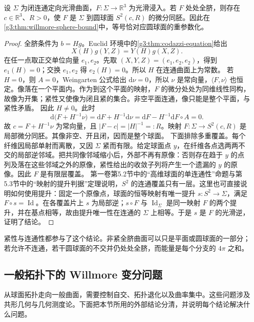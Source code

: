 \begin{proposition}\label{g3:prop:closed-umbilical-sphere}
	设 \(\Sigma\) 为闭连通定向光滑曲面，\(F:\Sigma\to\mathbb R^3\) 为光滑浸入。若 \(F\) 处处全脐，则存在 \(c\in\mathbb R^3\)、\(R>0\)，使 \(F\) 是 \(\Sigma\) 到圆球面 \(S^2(c,R)\) 的微分同胚。因此在\cref{g3:thm:willmore-sphere-bound}中，等号恰对应圆球面的重参数化。
\end{proposition}
\begin{proof}
	全脐条件为 \(b=Hg\)。Euclid 环境中的\cref{g3:thm:codazzi-equation}给出
	\[
		X(H)g(Y,Z)=Y(H)g(X,Z).
	\]
	在任一点取正交单位向量 \(e_1,e_2\)。先取 \((X,Y,Z)=(e_1,e_2,e_2)\)，得到 \(e_1(H)=0\)；交换 \(e_1,e_2\) 得 \(e_2(H)=0\)。所以 \(H\) 在连通曲面上为常数。
	若 \(H=0\)，则 \(A=0\)，Weingarten 公式给出 \(\mathrm d\nu=0\)，所以 \(\nu\) 是常向量，\(\langle F,\nu\rangle\) 也恒定。像落在一个平面内。作为到这个平面的映射，\(F\) 的微分处处为同维线性同构，故像为开集；紧性又使像为闭且紧的集合。非空平面连通，像只能是整个平面，与紧性矛盾。
	因此 \(H\ne0\)。此时
	\[
		\mathrm d\bigl(F+H^{-1}\nu\bigr)
		=\mathrm dF+H^{-1}\mathrm d\nu
		=\mathrm dF-H^{-1}\mathrm dF\circ A=0.
	\]
	故 \(c=F+H^{-1}\nu\) 为常向量，且 \(|F-c|=|H|^{-1}=:R\)。映射 \(F:\Sigma\to S^2(c,R)\) 是局部微分同胚。其像非空、开且闭，因而是整个球面。
	下面排除多重覆盖。每个纤维因局部单射而离散，又因 \(\Sigma\) 紧而有限。给定球面点 \(y\)，在纤维各点选两两不交的局部逆邻域。把共同像邻域缩小后，外部不再有原像：否则存在趋于 \(y\) 的点列及落在这些邻域之外的原像，紧性给出的收敛子列将产生一个遗漏的 \(y\) 的原像。因此 \(F\) 是有限层覆盖。
	第一卷第5.2节中的“高维球面的单连通性”命题与第5.3节中的“映射的提升判据”定理说明，\(S^2\) 的连通覆盖只有一层。这里也可直接说明如何使用提升：固定一个原像点，球面的恒等映射有唯一提升 \(s:S^2\to\Sigma\)，满足 \(F\circ s=\operatorname{Id}\)。在各覆盖片上 \(s\) 为局部逆；\(s\circ F\) 与 \(\operatorname{Id}_\Sigma\) 是同一映射 \(F\) 的两个提升，并在基点相等，故由提升唯一性在连通的 \(\Sigma\) 上相等。于是 \(s\) 是 \(F\) 的光滑逆，证明了结论。
\end{proof}

紧性与连通性都参与了这个结论。非紧全脐曲面可以只是平面或圆球面的一部分；若允许不连通，若干圆球面的不交并仍处处全脐，而能量是每个分支的 \(4\pi\) 之和。

\subsection{一般拓扑下的 Willmore 变分问题}
\label{g3:subsec:1906:05}
从球面拓扑走向一般曲面，需要控制自交、拓扑退化以及曲率集中。这些问题涉及共形几何与几何测度论。下面把本节所用的外部结论分清，并说明每个结论解决什么问题。

